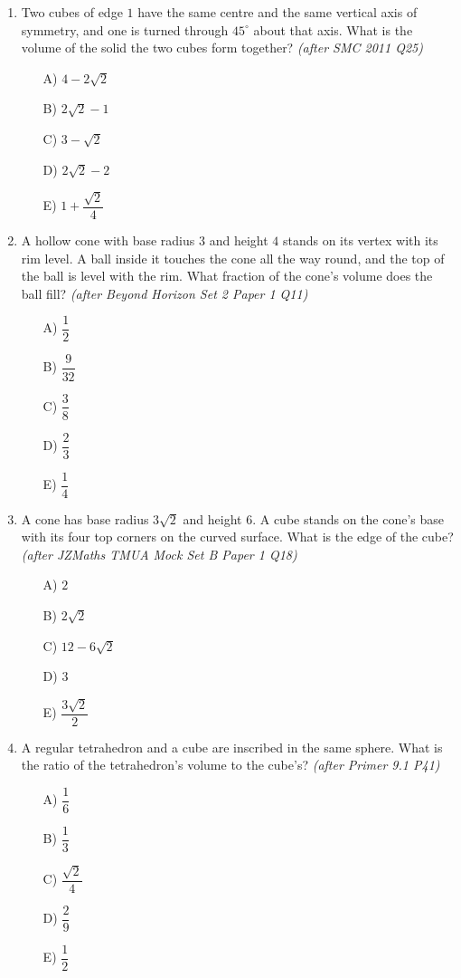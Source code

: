 \documentclass[11pt,a4paper]{article}
\begin{document}
\begin{enumerate}
\item Two cubes of edge $1$ have the same centre and the same vertical axis of symmetry, and one is turned through $45^\circ$ about that axis. What is the volume of the solid the two cubes form together? \textit{\small(after SMC 2011 Q25)}
\begin{itemize}[itemsep=3pt]
\item[A)] $4-2\sqrt2$
\item[B)] $2\sqrt2-1$
\item[C)] $3-\sqrt2$
\item[D)] $2\sqrt2-2$
\item[E)] $1+\dfrac{\sqrt2}{4}$
\end{itemize}

\item A hollow cone with base radius $3$ and height $4$ stands on its vertex with its rim level. A ball inside it touches the cone all the way round, and the top of the ball is level with the rim. What fraction of the cone's volume does the ball fill? \textit{\small(after Beyond Horizon Set 2 Paper 1 Q11)}
\begin{itemize}[itemsep=3pt]
\item[A)] $\dfrac12$
\item[B)] $\dfrac{9}{32}$
\item[C)] $\dfrac38$
\item[D)] $\dfrac23$
\item[E)] $\dfrac14$
\end{itemize}

\item A cone has base radius $3\sqrt2$ and height $6$. A cube stands on the cone's base with its four top corners on the curved surface. What is the edge of the cube? \textit{\small(after JZMaths TMUA Mock Set B Paper 1 Q18)}
\begin{itemize}[itemsep=3pt]
\item[A)] $2$
\item[B)] $2\sqrt2$
\item[C)] $12-6\sqrt2$
\item[D)] $3$
\item[E)] $\dfrac{3\sqrt2}{2}$
\end{itemize}

\item A regular tetrahedron and a cube are inscribed in the same sphere. What is the ratio of the tetrahedron's volume to the cube's? \textit{\small(after Primer 9.1 P41)}
\begin{itemize}[itemsep=3pt]
\item[A)] $\dfrac16$
\item[B)] $\dfrac13$
\item[C)] $\dfrac{\sqrt2}{4}$
\item[D)] $\dfrac29$
\item[E)] $\dfrac12$
\end{itemize}


\end{enumerate}
\end{document}
